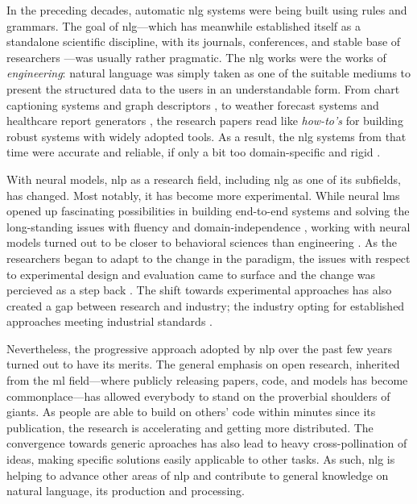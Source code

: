 In the preceding decades, automatic \ac{nlg} systems were being built using rules and grammars. The goal of \ac{nlg}---which has meanwhile established itself as a standalone scientific discipline, with its journals, conferences, and stable base of researchers \cite{ACLanthologySIGGEN}---was usually rather pragmatic.
The \ac{nlg} works were the works of \emph{engineering}: natural language was simply taken as one of the suitable mediums to present the structured data to the users in an understandable form. From chart captioning systems \cite{mittalDescribingComplexCharts1998} and graph descriptors \cite{sunDomainIndependentSentence2006}, to weather forecast systems \cite{belzAutomaticGenerationWeather2008} and healthcare report generators \cite{portetAutomaticGenerationTextual2009}, the research papers read like \emph{how-to's} for building robust systems with widely adopted tools. As a result, the \ac{nlg} systems from that time were accurate and reliable, if only a bit too domain-specific and rigid \cite{reiterBuildingAppliedNatural1997,gattSurveyStateArt2018}.


With neural models, \ac{nlp} as a research field, including \ac{nlg} as one of its subfields, has changed. Most notably, it has become more experimental. While neural \acp{lm} opened up fascinating possibilities in building end-to-end systems and solving the long-standing issues with fluency and domain-independence \cite{ferreiraNeuralDatatotextGeneration2019,dusekEvaluatingStateoftheartEndtoEnd2020,sharmaInnovationsNeuralDatatotext2022}, working with neural models turned out to be closer to behavioral sciences than engineering \cite{holtzmanGenerativeModelsComplex2023}. As the researchers began to adapt to the change in the paradigm, the issues with respect to experimental design and evaluation came to surface \cite{gehrmannRepairingCrackedFoundation2022} and the change was percieved as a step back \cite{reiter2020academic}. The shift towards experimental approaches has also created a gap between research and industry; the industry opting for established approaches meeting industrial standards \cite{daleNaturalLanguageGeneration2020,daleNavigatingTextGeneration2023}.


Nevertheless, the progressive approach adopted by \ac{nlp} over the past few years turned out to have its merits. The general emphasis on open research, inherited from the \ac{ml} field---where publicly releasing papers, code, and models has become commonplace---has allowed everybody to stand on the proverbial shoulders of giants. As people are able to build on others' code within minutes since its publication, the research is accelerating and getting more distributed. The convergence towards generic aproaches has also lead to heavy cross-pollination of ideas, making specific solutions easily applicable to other tasks. As such, \ac{nlg} is helping to advance other areas of \ac{nlp} and contribute to general knowledge on natural language, its production and processing.

